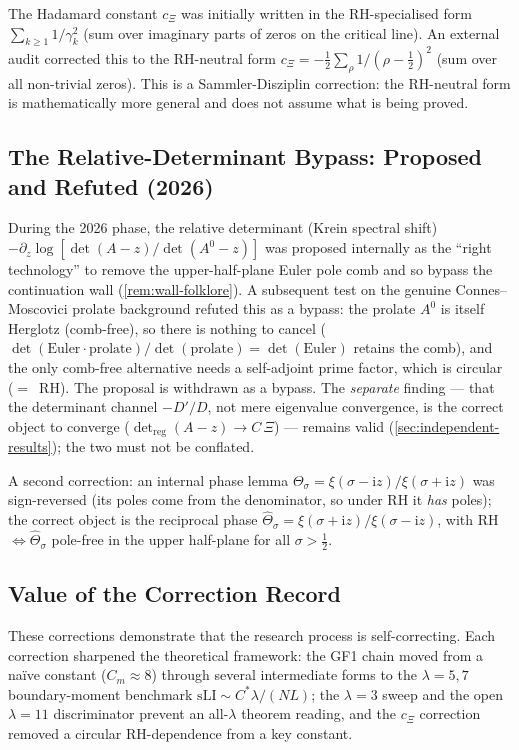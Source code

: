 \documentclass[12pt,a4paper]{article}
\theoremstyle{definition}
\theoremstyle{remark}
\begin{document}
The Hadamard constant $c_\Xi$ was initially written in the RH-specialised
form $\sum_{k\geq 1} 1/\gamma_k^2$ (sum over imaginary parts of zeros on
the critical line). An external audit corrected this to the RH-neutral
form
$c_\Xi = -\tfrac{1}{2}\sum_\rho 1/(\rho-\tfrac{1}{2})^2$
(sum over all non-trivial zeros). This is a Sammler-Disziplin correction:
the RH-neutral form is mathematically more general and does not assume what
is being proved.


\subsection{The Relative-Determinant Bypass: Proposed and Refuted (2026)}

During the 2026 phase, the relative determinant (Krein spectral shift)
$-\partial_z\log[\det(A-z)/\det(A^0-z)]$ was proposed internally as the ``right
technology'' to remove the upper-half-plane Euler pole comb and so bypass the
continuation wall (\cref{rem:wall-folklore}). A subsequent test on the genuine
Connes--Moscovici prolate background refuted this as a bypass: the prolate $A^0$ is
itself Herglotz (comb-free), so there is nothing to cancel
($\det(\text{Euler}\cdot\text{prolate})/\det(\text{prolate})=\det(\text{Euler})$
retains the comb), and the only comb-free alternative needs a self-adjoint prime
factor, which is circular ($=$~RH). The proposal is withdrawn as a bypass. The
\emph{separate} finding --- that the determinant channel $-D'/D$, not mere
eigenvalue convergence, is the correct object to converge
($\det_{\mathrm{reg}}(A-z)\to C\,\Xi$) --- remains valid
(\cref{sec:independent-results}); the two must not be conflated.

A second correction: an internal phase lemma
$\Theta_\sigma=\xi(\sigma-\mathrm{i}z)/\xi(\sigma+\mathrm{i}z)$ was sign-reversed
(its poles come from the denominator, so under RH it \emph{has} poles); the correct
object is the reciprocal phase
$\widehat\Theta_\sigma=\xi(\sigma+\mathrm{i}z)/\xi(\sigma-\mathrm{i}z)$, with
RH~$\Leftrightarrow\widehat\Theta_\sigma$ pole-free in the upper half-plane for all
$\sigma>\tfrac12$.


\subsection{Value of the Correction Record}

These corrections demonstrate that the research process is
self-correcting. Each correction sharpened the theoretical framework:
the GF1 chain moved from a na\"ive constant ($C_m \approx 8$) through
several intermediate forms to the $\lambda=5,7$ boundary-moment
benchmark $\mathrm{sLI} \sim C^*\lambda/(NL)$; the $\lambda=3$ sweep and
the open $\lambda=11$ discriminator prevent an all-$\lambda$ theorem reading,
and the $c_\Xi$ correction removed a
circular RH-dependence from a key constant.
\end{document}
